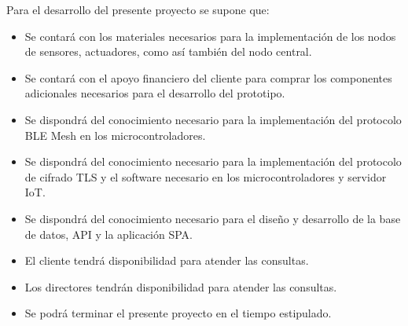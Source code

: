 Para el desarrollo del presente proyecto se supone que:

\begin{itemize}
	\item Se contará con los materiales necesarios para la implementación de los nodos de
	      sensores, actuadores, como así también del nodo central.
	\item Se contará con el apoyo financiero del cliente para comprar los componentes
	      adicionales necesarios para el desarrollo del prototipo.
	\item Se dispondrá del conocimiento necesario para la implementación del protocolo
	      BLE Mesh en los microcontroladores.
	\item Se dispondrá del conocimiento necesario para la implementación del protocolo de
	      cifrado TLS y el software necesario en los microcontroladores y servidor IoT.
	\item Se dispondrá del conocimiento necesario para el diseño y desarrollo de la base
	      de datos, API y la aplicación SPA.
	\item El cliente tendrá disponibilidad para atender las consultas.
	\item Los directores tendrán disponibilidad para atender las consultas.
	\item Se podrá terminar el presente proyecto en el tiempo estipulado.
\end{itemize}